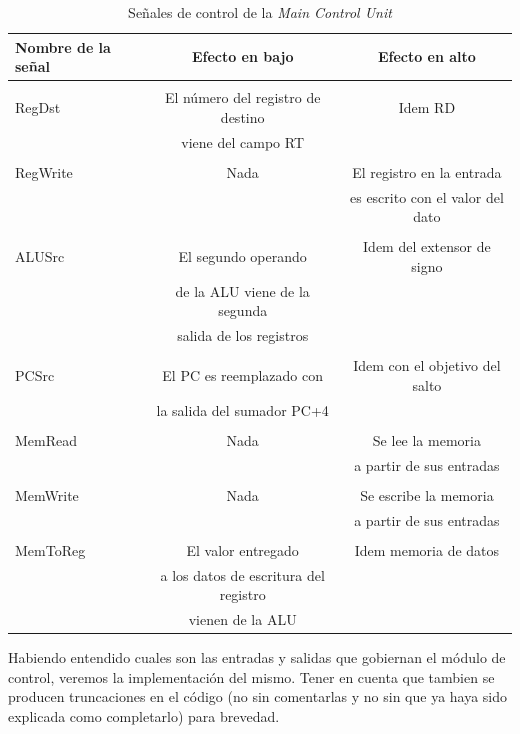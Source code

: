 \documentclass[12pt]{article}
\begin{document}
\begin{table}[!ht][H]
\centering
\caption{Señales de control de la \textit{Main Control Unit}}
\label{tab:controlsigcuadro}
\smallskip
\begin{tabular}{l c c}
\hline
Nombre de la señal & Efecto en bajo & Efecto en alto\\[0.5ex]
\hline
&&\\[-2ex]
RegDst & El número del registro de destino & Idem RD \\& viene del campo RT\\[0.5ex]
\hline
&&\\[-2ex]
RegWrite & Nada & El registro en la entrada \\&&es escrito con el valor del dato \\[0.5ex]
\hline
&&\\[-2ex]
ALUSrc & El segundo operando & Idem del extensor de signo \\&de la ALU viene de la segunda \\&salida de los registros \\[0.5ex]
\hline
&&\\[-2ex]
PCSrc & El PC es reemplazado con & Idem con el objetivo del salto \\&la salida del sumador PC+4  \\[0.5ex]
\hline
&&\\[-2ex]
MemRead & Nada & Se lee la memoria \\&&a partir de sus entradas \\[0.5ex]
\hline
&&\\[-2ex]
MemWrite & Nada & Se escribe la memoria \\&& a partir de sus entradas \\[0.5ex]
\hline
&&\\[-2ex]
MemToReg & El valor entregado & Idem memoria de datos\\& a los datos de escritura del registro \\&vienen de la ALU \\[0.5ex]
\hline
\end{tabular}
\end{table}

Habiendo entendido cuales son las entradas y salidas que gobiernan el módulo de control, veremos la implementación del mismo. Tener en cuenta que tambien se producen truncaciones en el código (no sin comentarlas y no sin que ya haya sido explicada como completarlo) para brevedad.
\end{document}
